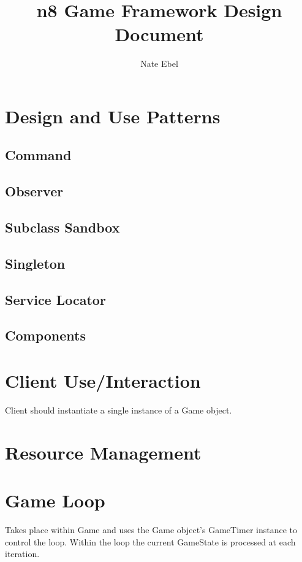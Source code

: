 \documentclass[12pt]{article}
\begin{document}
\title{n8 Game Framework Design Document}
\author{Nate Ebel}

\maketitle

\tableofcontents
\pagebreak

\section{Design and Use Patterns}
\subsection{Command}
\subsection{Observer}
\subsection{Subclass Sandbox}
\subsection{Singleton}
\subsection{Service Locator}
\subsection{Components}

\section{Client Use/Interaction}
Client should instantiate a single instance of a Game object.  

\section{Resource Management}

\section{Game Loop}
Takes place within Game and uses the Game object's GameTimer instance to control the loop.  Within the loop the current GameState is processed at each iteration.
		
\end{document}
